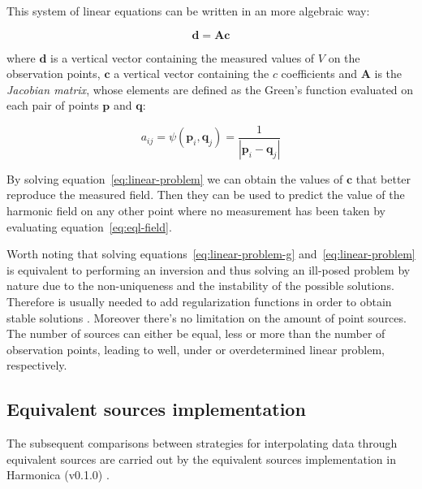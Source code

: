 \documentclass[twocolumn]{article}
\begin{document}
This system of linear equations can be written in an more algebraic way:

\begin{equation}
    \mathbf{d} = \mathbf{A} \mathbf{c}
    \label{eq:linear-problem}
\end{equation}

\noindent where $\mathbf{d}$ is a vertical vector containing the measured
values of $V$ on the observation points, $\mathbf{c}$ a vertical vector
containing the $c$ coefficients and $\mathbf{A}$ is the \emph{Jacobian matrix},
whose elements are defined as the Green's function evaluated on each pair of
points $\mathbf{p}$ and $\mathbf{q}$:

\begin{equation}
    a_{ij}
    =
    \psi(\mathbf{p}_i, \mathbf{q}_j)
    =
    \frac{1}{|\mathbf{p}_i - \mathbf{q}_j|}
\end{equation}

By solving equation~\ref{eq:linear-problem} we can obtain the values of
$\mathbf{c}$ that better reproduce the measured field.
Then they can be used to predict the value of the harmonic field on any other
point where no measurement has been taken by evaluating
equation~\ref{eq:eql-field}.

Worth noting that solving equations~\ref{eq:linear-problem-g}
and~\ref{eq:linear-problem} is equivalent to performing an inversion and thus
solving an ill-posed problem by nature due to the non-uniqueness and the
instability of the possible solutions.
Therefore is usually needed to add regularization functions in order to obtain
stable solutions \citep{oliveira2013}.
Moreover there's no limitation on the amount of point sources.
The number of sources can either be equal, less or more than the number of
observation points, leading to well, under or overdetermined linear problem,
respectively.



\subsection{Equivalent sources implementation}

The subsequent comparisons between strategies for interpolating data through
equivalent sources are carried out by the equivalent sources implementation in
Harmonica (v0.1.0) \citep{uieda2020}.
\end{document}
